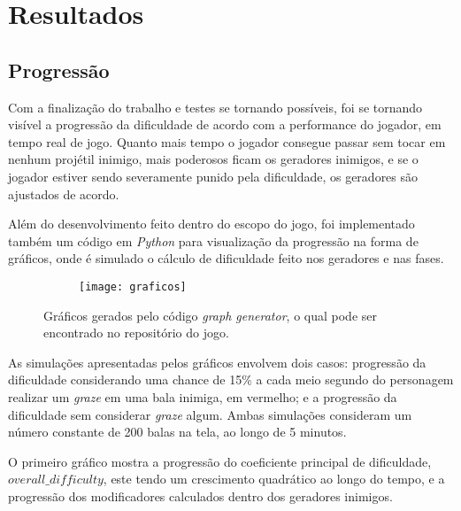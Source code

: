 
\chapter{Resultados}
\label{cap:resultados}
\section{Progressão}

Com a finalização do trabalho e testes se tornando possíveis, foi se tornando visível a progressão da dificuldade de acordo com a performance do jogador, em tempo real de jogo. Quanto mais tempo o jogador consegue passar sem tocar em nenhum projétil inimigo, mais poderosos ficam os geradores inimigos, e se o jogador estiver sendo severamente punido pela dificuldade, os geradores são ajustados de acordo.

Além do desenvolvimento feito dentro do escopo do jogo, foi implementado também um código em \textit{Python} para visualização da progressão na forma de gráficos, onde é simulado o cálculo de dificuldade feito nos geradores e nas fases.

\begin{figure}
    \centering

    \begin{subfigure}{.7\textwidth}
        \centering
        \texttt{[image: graficos]}
    \end{subfigure}

    \caption{Gráficos gerados pelo código \textit{graph generator}, o qual pode ser encontrado no repositório do jogo.}
\end{figure}

As simulações apresentadas pelos gráficos envolvem dois casos: progressão da dificuldade considerando uma chance de 15\% a cada meio segundo do personagem realizar um \textit{graze} em uma bala inimiga, em vermelho; e a progressão da dificuldade sem considerar \textit{graze} algum. Ambas simulações consideram um número constante de 200 balas na tela, ao longo de 5 minutos.

O primeiro gráfico mostra a progressão do coeficiente principal de dificuldade, $overall\_difficulty$, este tendo um crescimento quadrático ao longo do tempo, e a progressão dos modificadores calculados dentro dos geradores inimigos.

